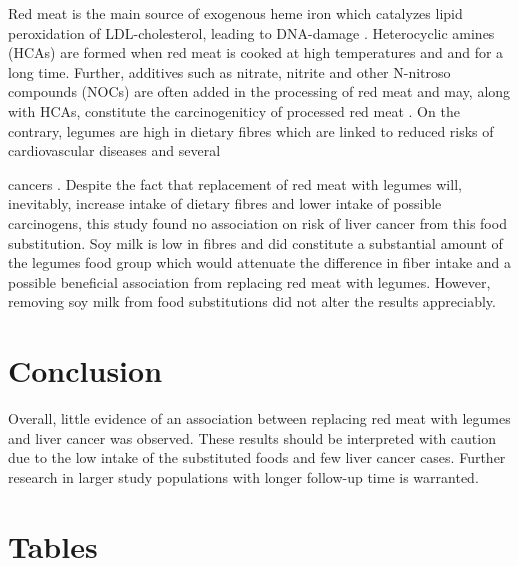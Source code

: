 \documentclass[
]{article}
\begin{document}
Red meat is the main source of exogenous heme iron which catalyzes lipid
peroxidation of LDL-cholesterol, leading to DNA-damage \autocite{Jeney2002}.
Heterocyclic amines (HCAs) are formed when red meat is cooked at high
temperatures and and for a long time. Further, additives such as
nitrate, nitrite and other N-nitroso compounds (NOCs) are often added in
the processing of red meat and may, along with HCAs, constitute the
carcinogeniticy of processed red meat \autocite{Felton1997,Li2022,Seyyedsalehi2023}. On the contrary, legumes are high in dietary fibres
which are linked to reduced risks of cardiovascular diseases and several

cancers \autocite{Dahm2024,Hu2023}. Despite the fact that replacement of red
meat with legumes will, inevitably, increase intake of dietary fibres
and lower intake of possible carcinogens, this study found no
association on risk of liver cancer from this food substitution. Soy
milk is low in fibres and did constitute a substantial amount of the
legumes food group which would attenuate the difference in fiber intake
and a possible beneficial association from replacing red meat with
legumes. However, removing soy milk from food substitutions did not
alter the results appreciably.

\hypertarget{sec5}{%
\section{Conclusion}\label{sec5}}

Overall, little evidence of an association between replacing red meat
with legumes and liver cancer was observed. These results should be
interpreted with caution due to the low intake of the substituted foods
and few liver cancer cases. Further research in larger study populations
with longer follow-up time is warranted.

\onecolumn

\hypertarget{sec7}{%
\section{Tables}\label{sec7}}
\end{document}
